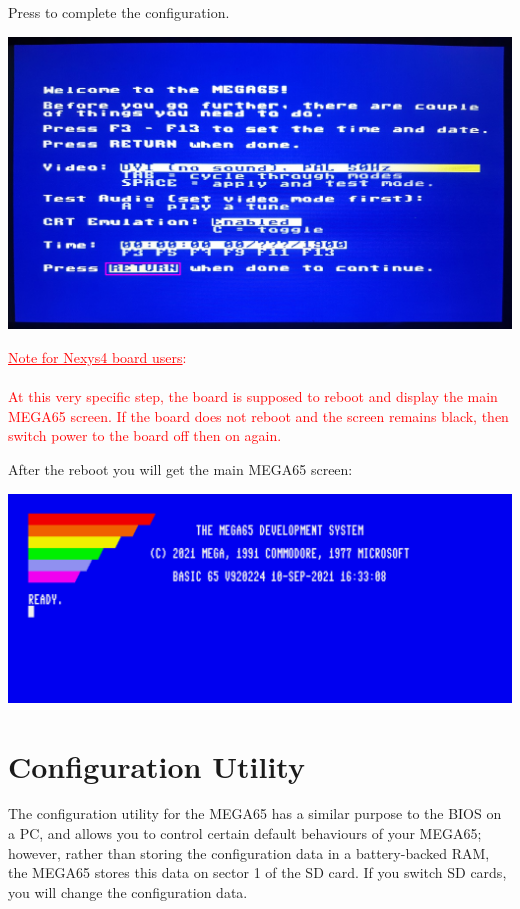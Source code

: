 Press  to complete the configuration.

\begin{center}
  \includegraphics[width=0.7\linewidth]{images/img011_final_boot_05.png}
\end{center}

\ifdefined\printmanual
\else
\textcolor{red}{\underline{Note for Nexys4 board users}: \\
\\
  At this very specific step, the board is supposed to reboot and display the main MEGA65 screen. If the board does not reboot and the screen remains black, then switch power to the board off then on again.}
\fi

After the reboot you will get the main MEGA65 screen:

\begin{center}
  \includegraphics[width=0.7\linewidth]{images/img011_final_boot_06.png}
\end{center}

\section{Configuration Utility}
\label{sec:configuration-utility}

The configuration utility for the MEGA65 has a similar purpose to the BIOS on a PC, and allows you to control certain default behaviours of your MEGA65; however, rather than storing the configuration data in a
battery-backed RAM, the MEGA65 stores this data on sector 1 of the SD card. If you switch SD cards, you will change the configuration data.

